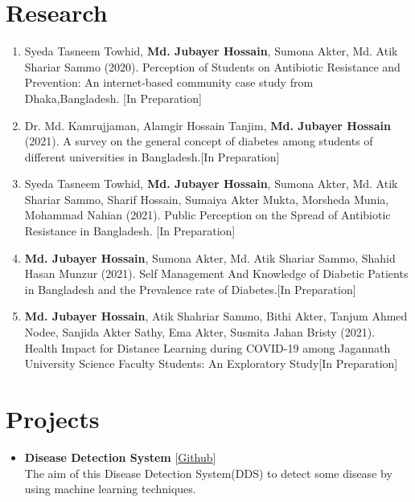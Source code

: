 \documentclass[11pt,a4paper]{moderncv}
\begin{document}
\section{Research}
\begin{enumerate}
	\item Syeda Tasneem Towhid, \textbf{Md. Jubayer Hossain}, Sumona Akter, Md. 
	Atik Shariar Sammo (2020). Perception of Students on Antibiotic Resistance 
	and Prevention: An internet-based community case study from 
	Dhaka,Bangladesh. \hfill [In Preparation]
	\item Dr. Md. Kamrujjaman, Alamgir Hossain Tanjim, \textbf{Md. Jubayer 
	Hossain} (2021). A survey on the general concept of diabetes among students 
	of different universities in Bangladesh.\hfill [In Preparation]
	\item Syeda Tasneem Towhid, \textbf{Md. Jubayer Hossain}, Sumona Akter, Md. 
	Atik Shariar Sammo, Sharif Hossain, Sumaiya Akter Mukta, Morsheda Munia, 
	Mohammad Nahian (2021). Public Perception on the Spread of Antibiotic 
	Resistance in Bangladesh. \hfill [In Preparation]
	\item\textbf{ Md. Jubayer Hossain}, Sumona Akter, Md. Atik Shariar Sammo, 
	Shahid Hasan Munzur (2021). Self Management And Knowledge of Diabetic 
	Patients in Bangladesh and the Prevalence rate of Diabetes.\hfill [In 
	Preparation]
	\item \textbf{Md. Jubayer Hossain}, Atik Shahriar Sammo, Bithi Akter, 
	Tanjum Ahmed Nodee, Sanjida Akter Sathy, Ema Akter, Susmita Jahan Bristy 
	(2021). Health 
	Impact for Distance Learning during COVID-19 among Jagannath University 
	Science Faculty Students: An Exploratory Study\hfill [In Preparation]

\end{enumerate}

\section{Projects}
\begin{itemize}	
	\item\textbf{Disease Detection System} 
	\hfill [\href{https://github.com/hdrobd/DDS}{Github}]\\
	The aim of this Disease Detection System(DDS) to detect some disease by 
	using machine learning techniques.
\end{itemize}
\end{document}

